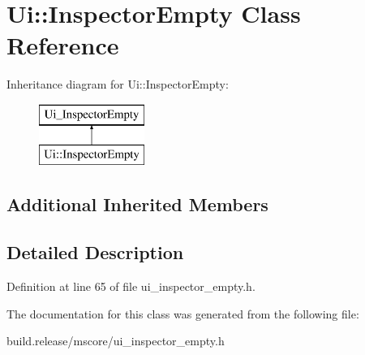 \hypertarget{class_ui_1_1_inspector_empty}{}\section{Ui\+:\+:Inspector\+Empty Class Reference}
\label{class_ui_1_1_inspector_empty}
Inheritance diagram for Ui\+:\+:Inspector\+Empty\+:\begin{figure}[H]
\begin{center}
\leavevmode
\includegraphics[height=2.000000cm]{class_ui_1_1_inspector_empty}
\end{center}
\end{figure}
\subsection*{Additional Inherited Members}


\subsection{Detailed Description}


Definition at line 65 of file ui\+\_\+inspector\+\_\+empty.\+h.



The documentation for this class was generated from the following file\+:\begin{DoxyCompactItemize}
\item 
build.\+release/mscore/ui\+\_\+inspector\+\_\+empty.\+h\end{DoxyCompactItemize}
